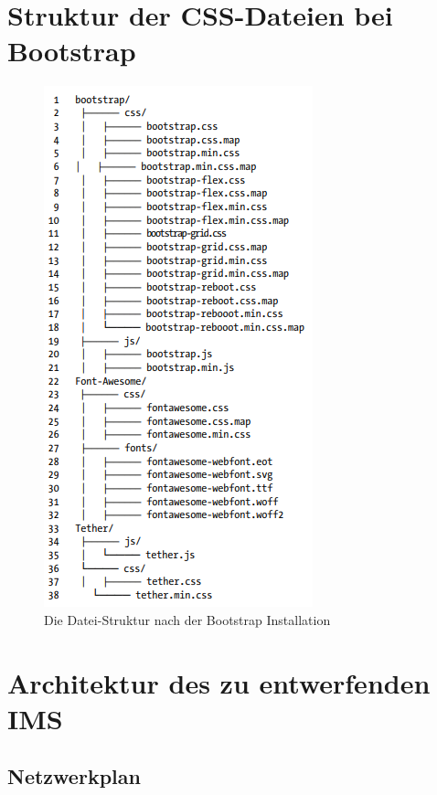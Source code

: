 \documentclass[a4paper,titlepage,halfparskip,12pt]{scrreprt}
\begin{document}

\newpage
\appendix
{}

\chapter{Struktur der CSS-Dateien bei Bootstrap}
\begin{figure}[h]
	\centering
	\includegraphics[width=.50\linewidth]{images/BootstrapStructer}
	\caption{Die Datei-Struktur nach der Bootstrap Installation}
	\label{img:BootstrapStructer}
\end{figure}

\chapter{Architektur des zu entwerfenden \ac{IMS}}

\section{Netzwerkplan}
\end{document}

